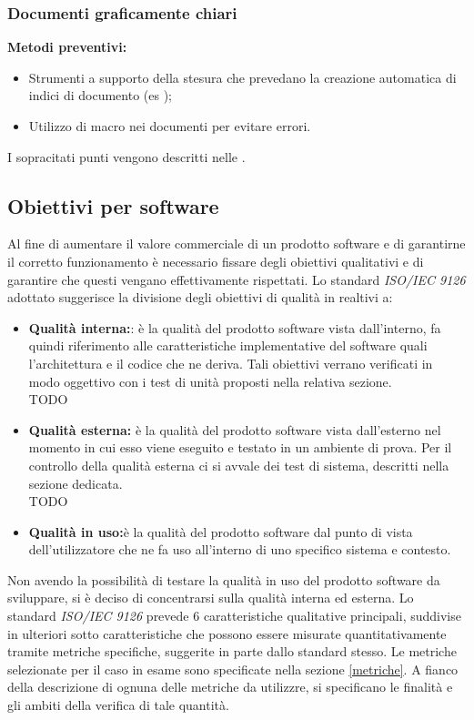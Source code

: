 \documentclass[12pt,a4paper]{article}
\begin{document}
\subsubsection{Documenti graficamente chiari}
\textbf{Metodi preventivi:} 
\begin{itemize}
	\item Strumenti a supporto della stesura che prevedano la creazione automatica di indici di documento (es \latex);
	\item Utilizzo di macro nei documenti per evitare errori.
\end{itemize}
I sopracitati punti vengono descritti nelle \NdP{}.


\subsection{Obiettivi per software}
Al fine di aumentare il valore commerciale di un prodotto software e di garantirne il
corretto funzionamento è necessario fissare degli obiettivi qualitativi e di garantire che
questi vengano effettivamente rispettati.
Lo standard  \textit{ISO/IEC 9126} adottato suggerisce la divisione degli obiettivi  di qualità in realtivi a:
\begin{itemize}
\item\textbf{Qualità interna:}: è la qualità del prodotto software vista dall’interno, fa quindi riferimento alle caratteristiche implementative del software quali l’architettura e il codice che ne deriva. Tali obiettivi verrano verificati in modo oggettivo con i test di unità proposti nella relativa sezione. \\TODO
\item\textbf{Qualità esterna:} è la qualità del prodotto software vista dall’esterno nel momento in cui esso viene eseguito e testato in un ambiente di prova. Per il controllo della qualità esterna ci si avvale dei test di sistema, descritti nella sezione dedicata.\\TODO
\item\textbf{Qualità in uso:}è la qualità del prodotto software dal punto di vista dell’utilizzatore che ne fa uso all’interno di uno specifico sistema e contesto. 
\end{itemize}
Non avendo la possibilità di testare la qualità in uso del prodotto software da sviluppare, si è deciso di concentrarsi sulla qualità interna ed esterna. Lo standard  \textit{ISO/IEC 9126}  prevede 6 caratteristiche qualitative principali, suddivise in ulteriori sotto caratteristiche che possono essere misurate quantitativamente tramite metriche specifiche, suggerite in parte dallo standard stesso. Le metriche selezionate per il caso in esame sono specificate nella sezione \ref{metriche}. A fianco della descrizione di ognuna delle metriche da utilizzre, si specificano le finalità e gli ambiti della verifica di tale quantità.
\end{document}
